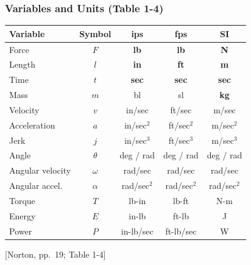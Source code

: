 \documentclass[10pt,aspectratio=43]{beamer}
\newcommand{\pref}[1]{\vfill\hfill{\scriptsize\color{gray}[Norton, pp.~#1]}}
\begin{document}
\begin{frame}
\frametitle{Variables and Units (Table 1-4)}

\begin{center}
\small
\begin{tabular}{l|c|c|c|c}
\toprule
\textbf{Variable} & \textbf{Symbol} & \textbf{ips} & \textbf{fps} & \textbf{SI} \\
\midrule
Force & $F$ & \textbf{lb} & \textbf{lb} & \textbf{N} \\
Length & $l$ & \textbf{in} & \textbf{ft} & \textbf{m} \\
Time & $t$ & \textbf{sec} & \textbf{sec} & \textbf{sec} \\
Mass & $m$ & bl & sl & \textbf{kg} \\
Velocity & $v$ & in/sec & ft/sec & m/sec \\
Acceleration & $a$ & in/sec$^2$ & ft/sec$^2$ & m/sec$^2$ \\
Jerk & $j$ & in/sec$^3$ & ft/sec$^3$ & m/sec$^3$ \\
Angle & $\theta$ & deg / rad & deg / rad & deg / rad \\
Angular velocity & $\omega$ & rad/sec & rad/sec & rad/sec \\
Angular accel.\ & $\alpha$ & rad/sec$^2$ & rad/sec$^2$ & rad/sec$^2$ \\
Torque & $T$ & lb-in & lb-ft & N-m \\
Energy & $E$ & in-lb & ft-lb & J \\
Power & $P$ & in-lb/sec & ft-lb/sec & W \\
\bottomrule
\end{tabular}
\end{center}
\pref{19; Table 1-4}
\end{frame}
\end{document}
